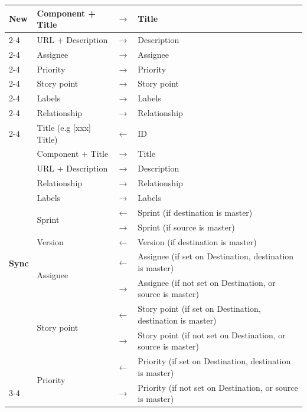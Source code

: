 \begin{longtable}{|l|l|l|l|}
   \multirow{8}{*}{\textbf{New}}
      & Component + Title & $\rightarrow$ & Title \\
      \cline{2-4}
      & URL + Description & $\rightarrow$ & Description \\
      \cline{2-4}
      & Assignee & $\rightarrow$ & Assignee \\
      \cline{2-4}
      & Priority & $\rightarrow$ & Priority \\
      \cline{2-4}
      & Story point & $\rightarrow$ & Story point \\
      \cline{2-4}
      & Labels & $\rightarrow$ & Labels \\
      \cline{2-4}
      & Relationship & $\rightarrow$ & Relationship \\
      \cline{2-4}
      & Title (e.g [xxx] Title) & $\leftarrow$ & ID \\
   \hline
   \multirow{12}{*}{\textbf{Sync}}
      & Component + Title & $\rightarrow$ & Title \\
      \cline{2-4}
      & URL + Description & $\rightarrow$ & Description \\
      \cline{2-4}
      & Relationship & $\rightarrow$ & Relationship \\
      \cline{2-4}
      & Labels & $\rightarrow$ & Labels \\
      \cline{2-4}
      & \multirow{2}{*}{Sprint}
         & $\leftarrow$ & Sprint (if destination is master) \\
         \cline{3-4}
         & & $\rightarrow$ & Sprint (if source is master) \\
      \cline{2-4}
      & Version & $\leftarrow$ & Version (if destination is master) \\
      \cline{2-4}
      & \multirow{2}{*}{Assignee}
         & $\leftarrow$ & Assignee (if set on Destination, destination is master) \\
         \cline{3-4}
         & & $\rightarrow$ & Assignee (if not set on Destination, or source is master) \\
      \cline{2-4}
      & \multirow{2}{*}{Story point}
         & $\leftarrow$ & Story point (if set on Destination, destination is master) \\
         \cline{3-4}
         & & $\rightarrow$ & Story point (if not set on Destination, or source is master) \\
      \cline{2-4}
      & \multirow{2}{*}{Priority}
         & $\leftarrow$ & Priority (if set on Destination, destination is master) \\
         \cline{3-4}
         & & $\rightarrow$ & Priority (if not set on Destination, or source is master) \\
   \hline
\end{longtable}


